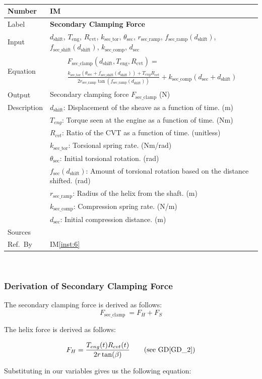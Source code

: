 \documentclass[12pt]{article}
\newcommand{\colAwidth}{0.13\textwidth}
\newcommand{\colBwidth}{0.82\textwidth}
\newcommand{\dref}[1]{GD\ref{#1}}
\newcounter{instnum} %
\newcommand{\iref}[1]{IM\ref{#1}}
\newcommand{\definstance}[7] {
~\newline
\noindent
\begin{minipage}{\textwidth}
\renewcommand*{\arraystretch}{1.5}
\begin{tabular}{| p{\colAwidth} | p{\colBwidth}|}
  \hline
  \rowcolor[gray]{0.9}
  Number& IM\refstepcounter{instnum}\theinstnum \label{inst:\theinstnum}\\
  \hline
  Label& \bf #1 \\
  \hline
  Input& #2\\
  \hline
  Equation& #3\\
  \hline
  Output& #4\\
  \hline
  Description& #5 \\
  \hline
  Sources& #6 \\
  \hline
  Ref.\ By & #7\\
  \hline
\end{tabular}
\end{minipage}\\
}
\begin{document}
\definstance
{Secondary Clamping Force}
{$d_\text{shift}$, $T_\text{eng}$, $R_\text{cvt}$, $k_{\text{sec\_tor}}$, $\theta_{\text{sec}}$, $r_{\text{sec\_ramp}}$, $f_{\text{sec\_ramp}}(d_{\text{shift}})$, $f_{\text{sec\_shift}}(d_{\text{shift}})$, $k_{\text{sec\_comp}}$, $d_{\text{sec}}$} %
{
  \begin{multline*}
    F_{\text{sec\_clamp}}(d_\text{shift}, T_\text{eng}, R_\text{cvt}) = \\
  \frac{k_{\text{sec\_tor}} (\theta_{\text{sec}} + f_{\text{sec\_shift}}(d_\text{shift})) + T_{eng} R_{cvt}}{2 r_{\text{sec\_ramp}} \tan(f_{\text{sec\_ramp}}(d_{\text{shift}}))} + k_{\text{sec\_comp}} (d_{\text{sec}} + d_{\text{shift}})
  \end{multline*}
} %
{Secondary clamping force $F_{\text{sec\_clamp}}$ (N)} %
{
  $d_{\text{shift}}$: Displacement of the sheave as a function of time. (m)\\
  &$T_{eng}$: Torque seen at the engine as a function of time. (Nm) \\
  &$R_{cvt}$: Ratio of the CVT as a function of time. (unitless) \\
  &$k_{\text{sec\_tor}}$: Torsional spring rate. (Nm/rad)\\
  &$\theta_{\text{sec}}$: Initial torsional rotation. (rad)\\
  &$f_{\text{sec}}(d_{\text{shift}})$: Amount of torsional rotation based on the distance shifted. (rad) \\
  &$r_{\text{sec\_ramp}}$: Radius of the helix from the shaft. (m)\\
  &$k_{\text{sec\_comp}}$: Compression spring rate. (N/m)\\
  &$d_{\text{sec}}$: Initial compression distance. (m)
} %
{} %
{\iref{inst:6}}

\subsubsection*{Derivation of Secondary Clamping Force}

The secondary clamping force is derived as follows:
\[
F_{\text{sec\_clamp}}\ = F_H + F_S
\]

The helix force is derived as follows:

\[
F_H = \frac{T_{eng}(t) R_{cvt}(t)}{2r\tan(\beta)}  \tag*{\text{(see \dref{GD_2})}} %
\]

Substituting in our variables gives us the following equation:
\end{document}
